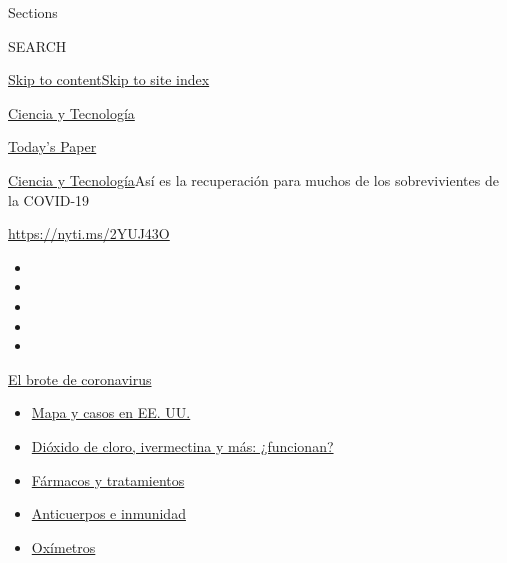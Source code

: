 Sections

SEARCH

\protect\hyperlink{site-content}{Skip to
content}\protect\hyperlink{site-index}{Skip to site index}

\href{https://www.nytimes3xbfgragh.onion/es/section/ciencia-y-tecnologia}{Ciencia
y Tecnología}

\href{https://myaccount.nytimes3xbfgragh.onion/auth/login?response_type=cookie\&client_id=vi}{}

\href{https://www.nytimes3xbfgragh.onion/section/todayspaper}{Today's
Paper}

\href{/es/section/ciencia-y-tecnologia}{Ciencia y
Tecnología}\textbar{}Así es la recuperación para muchos de los
sobrevivientes de la COVID-19

\url{https://nyti.ms/2YUJ43O}

\begin{itemize}
\item
\item
\item
\item
\item
\end{itemize}

\href{https://www.nytimes3xbfgragh.onion/es/spotlight/coronavirus?action=click\&pgtype=Article\&state=default\&region=TOP_BANNER\&context=storylines_menu}{El
brote de coronavirus}

\begin{itemize}
\tightlist
\item
  \href{https://www.nytimes3xbfgragh.onion/es/interactive/2020/espanol/mundo/coronavirus-en-estados-unidos.html?action=click\&pgtype=Article\&state=default\&region=TOP_BANNER\&context=storylines_menu}{Mapa
  y casos en EE. UU.}
\item
  \href{https://www.nytimes3xbfgragh.onion/es/2020/07/23/espanol/america-latina/bolivia-cloro-coronavirus-ivermectina.html?action=click\&pgtype=Article\&state=default\&region=TOP_BANNER\&context=storylines_menu}{Dióxido
  de cloro, ivermectina y más: ¿funcionan?}
\item
  \href{https://www.nytimes3xbfgragh.onion/es/interactive/2020/science/coronavirus-tratamientos-curas.html?action=click\&pgtype=Article\&state=default\&region=TOP_BANNER\&context=storylines_menu}{Fármacos
  y tratamientos}
\item
  \href{https://www.nytimes3xbfgragh.onion/es/2020/07/28/espanol/ciencia-y-tecnologia/anticuerpos-coronavirus-inmunidad.html?action=click\&pgtype=Article\&state=default\&region=TOP_BANNER\&context=storylines_menu}{Anticuerpos
  e inmunidad}
\item
  \href{https://www.nytimes3xbfgragh.onion/es/2020/04/29/espanol/estilos-de-vida/oximetro-para-que-sirve.html?action=click\&pgtype=Article\&state=default\&region=TOP_BANNER\&context=storylines_menu}{Oxímetros}
\end{itemize}

